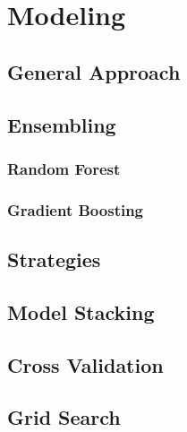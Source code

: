 \chapter{Modeling}
\label{chap:Modeling}

\section{General Approach}
\label{sec:General Approach}

\section{Ensembling}
\label{sec:Ensembling}

\subsection{Random Forest}
\label{sub:Random Forest}

\subsection{Gradient Boosting}
\label{sub:Gradient Boosting}

\section{Strategies}
\label{sec:Strategies}

\section{Model Stacking}
\label{sec:Model Stacking}

\section{Cross Validation}
\label{sec:Cross Validation}

\section{Grid Search}
\label{sec:Grid Search}
